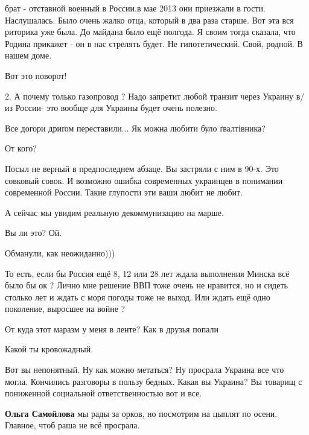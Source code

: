 \begin{itemize}
\begin{itemize}
брат - отставной военный в России.в мае 2013 они приезжали в гости.
Наслушалась. Было очень жалко отца, который в два раза старше. Вот эта вся
риторика уже была. До майдана было ещё полгода. Я своим тогда сказала, что
Родина прикажет - он в нас стрелять будет. Не гипотетический. Свой, родной. В
нашем доме.

\end{itemize} %

Вот это поворот!


2. А почему только газопровод ? Надо запретит любой транзит через Украину в/из
России- это вообще для Украины будет очень полезно.

Все догори дриґом переставили... Як можна любити було ґвалтівника?

От кого?


Посыл не верный в предпоследнем абзаце. Вы застряли с ним в 90-х. Это совковый
совок. И возможно ошибка современных украинцев в понимании современной России.
Такие глупости эти ваши любит не любит.

А сейчас мы увидим реальную декоммунизацию на марше.

Вы ли это? Ой.

Обманули, как неожиданно)))


То есть, если бы Россия ещё 8, 12 или 28 лет ждала выполнения Минска всё было
бы ок ? Лично мне решение ВВП тоже очень не нравится, но и сидеть столько лет и
ждать с моря погоды тоже не выход. Или ждать ещё одно поколение, выросшее на
войне ?

От куда этот маразм у меня в ленте? Как в друзья попали

Какой ты кровожадный.


Вот вы непонятный. Ну как можно метаться? Ну просрала Украина все что могла.
Кончились разговоры в пользу бедных. Какая вы Украина? Вы товарищ с пониженной
социальной ответственностью вот и все.

\begin{itemize} %
\textbf{Ольга Самойлова} мы рады за орков, но посмотрим на цыплят по осени. Главное, чтоб раша не всё просрала.


\end{itemize}
\end{itemize}
